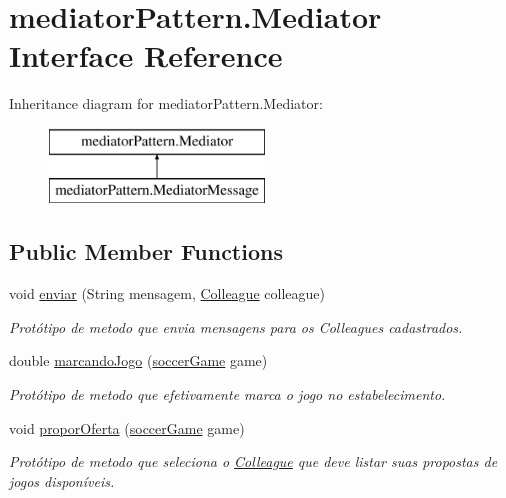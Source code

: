 \hypertarget{interfacemediator_pattern_1_1_mediator}{}\section{mediator\+Pattern.\+Mediator Interface Reference}
\label{interfacemediator_pattern_1_1_mediator}
Inheritance diagram for mediator\+Pattern.\+Mediator\+:\begin{figure}[H]
\begin{center}
\leavevmode
\includegraphics[height=2.000000cm]{interfacemediator_pattern_1_1_mediator}
\end{center}
\end{figure}
\subsection*{Public Member Functions}
\begin{DoxyCompactItemize}
\item 
void \mbox{\hyperlink{interfacemediator_pattern_1_1_mediator_aa65168a13dac30a0e6becf57997b5cb8}{enviar}} (String mensagem, \mbox{\hyperlink{classmediator_pattern_1_1_colleague}{Colleague}} colleague)
\begin{DoxyCompactList}\small\item\em Protótipo de metodo que envia mensagens para os Colleagues cadastrados. \end{DoxyCompactList}\item 
double \mbox{\hyperlink{interfacemediator_pattern_1_1_mediator_a93da9c7e1478883a0655796d88b7ee62}{marcando\+Jogo}} (\mbox{\hyperlink{classtemplate_pattern_1_1soccer_game}{soccer\+Game}} game)
\begin{DoxyCompactList}\small\item\em Protótipo de metodo que efetivamente marca o jogo no estabelecimento. \end{DoxyCompactList}\item 
void \mbox{\hyperlink{interfacemediator_pattern_1_1_mediator_ad5219430e61d5602b1f8b7f6b8b35632}{propor\+Oferta}} (\mbox{\hyperlink{classtemplate_pattern_1_1soccer_game}{soccer\+Game}} game)
\begin{DoxyCompactList}\small\item\em Protótipo de metodo que seleciona o \mbox{\hyperlink{classmediator_pattern_1_1_colleague}{Colleague}} que deve listar suas propostas de jogos disponíveis. \end{DoxyCompactList}\end{DoxyCompactItemize}


